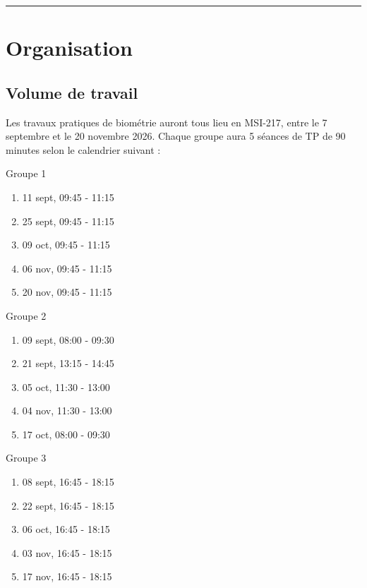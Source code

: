 \documentclass[
  a4paper,
  DIV=11,
  numbers=noendperiod,
  oneside]{scrreprt}
\providecommand{\tightlist}{%
  \setlength{\itemsep}{0pt}\setlength{\parskip}{0pt}}\usepackage{longtable,booktabs,array}
\begin{document}
\begin{center}\rule{0.5\linewidth}{0.5pt}\end{center}

\section*{Organisation}\label{organisation}


\subsection*{Volume de travail}\label{volume-de-travail}

Les travaux pratiques de biométrie auront tous lieu en MSI-217, entre le
7 septembre et le 20 novembre 2026. Chaque groupe aura 5 séances de TP
de 90 minutes selon le calendrier suivant :

Groupe 1

\begin{enumerate}
\def\labelenumi{\arabic{enumi}.}
\tightlist
\item
  11 sept, 09:45 - 11:15
\item
  25 sept, 09:45 - 11:15
\item
  09 oct, 09:45 - 11:15
\item
  06 nov, 09:45 - 11:15
\item
  20 nov, 09:45 - 11:15
\end{enumerate}

Groupe 2

\begin{enumerate}
\def\labelenumi{\arabic{enumi}.}
\tightlist
\item
  09 sept, 08:00 - 09:30
\item
  21 sept, 13:15 - 14:45
\item
  05 oct, 11:30 - 13:00
\item
  04 nov, 11:30 - 13:00
\item
  17 oct, 08:00 - 09:30
\end{enumerate}

Groupe 3

\begin{enumerate}
\def\labelenumi{\arabic{enumi}.}
\tightlist
\item
  08 sept, 16:45 - 18:15
\item
  22 sept, 16:45 - 18:15
\item
  06 oct, 16:45 - 18:15
\item
  03 nov, 16:45 - 18:15
\item
  17 nov, 16:45 - 18:15
\end{enumerate}
\end{document}
